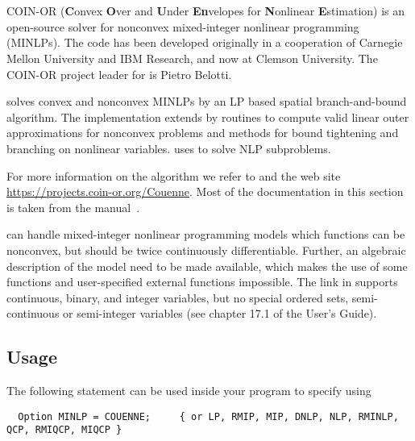 \chapter{\COUENNE}

COIN-OR \COUENNE (\textbf{C}onvex \textbf{O}ver and \textbf{U}nder \textbf{En}velopes for \textbf{N}onlinear \textbf{E}stimation) is an open-source solver for nonconvex mixed-integer nonlinear programming (MINLPs).
The code has been developed originally in a cooperation of Carnegie Mellon University and IBM Research, and now at Clemson University.
The COIN-OR project leader for \COUENNE is Pietro Belotti.

\COUENNE solves convex and nonconvex MINLPs by an LP based spatial branch-and-bound algorithm. %
The implementation extends \BONMIN by routines to compute valid linear outer approximations for nonconvex problems and methods for bound tightening and branching on nonlinear variables.
\COUENNE uses \IPOPT to solve NLP subproblems.

For more information on the algorithm we refer to \cite{Be09,BeLeLiMaWa08} and the \COUENNE web site \url{https://projects.coin-or.org/Couenne}.
Most of the \COUENNE documentation in this section is taken from the \COUENNE manual~\cite{CouenneManual}.

\COUENNE can handle mixed-integer nonlinear programming models which functions can be nonconvex, but should be twice continuously differentiable. Further, an algebraic description of the model need to be made available, which makes the use of some \GAMS functions and user-specified external functions impossible.
The \COUENNE link in \GAMS supports continuous, binary, and integer variables, but no special ordered sets, semi-continuous or semi-integer variables (see chapter 17.1 of the \GAMS User's Guide).


\section{Usage}

The following statement can be used inside your \GAMS program to specify using \COUENNE
\begin{verbatim}
  Option MINLP = COUENNE;     { or LP, RMIP, MIP, DNLP, NLP, RMINLP, QCP, RMIQCP, MIQCP }
\end{verbatim}

